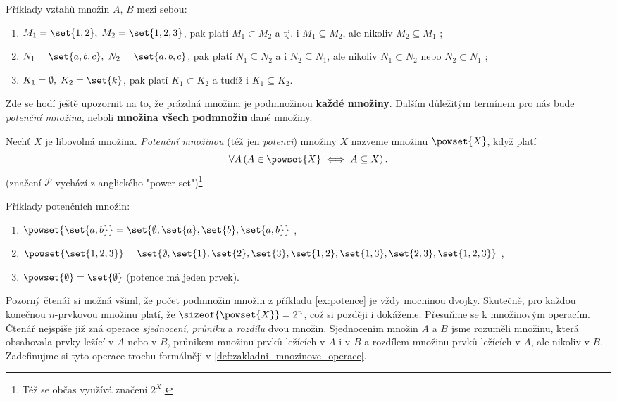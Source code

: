 \begin{example}
    Příklady vztahů množin $A,\,B$ mezi sebou:
    \begin{enumerate}[label=(\roman*)]
        \item $M_1=\set{1,2},\; M_2=\set{1,2,3}$, pak platí $M_1 \subset M_2$ a tj. i $M_1 \subseteq M_2$, ale nikoliv $M_2 \subseteq M_1$ ;
        \item $N_1=\set{a,b,c},\; N_2=\set{a,b,c}$, pak platí $N_1 \subseteq N_2$ a i $N_2 \subseteq N_1$, ale nikoliv $N_1 \subset N_2$ nebo $N_2 \subset N_1$ ;
        \item $K_1=\emptyset,\; K_2=\set{k}$, pak platí $K_1 \subset K_2$ a tudíž i $K_1 \subseteq K_2$.
    \end{enumerate}
\end{example}
Zde se hodí ještě upozornit na to, že prázdná množina je podmnožinou \textbf{každé množiny}. Dalším důležitým termínem pro nás bude \emph{potenční množina}, neboli \textbf{množina všech podmnožin} dané množiny.
\begin{definition}\label{def:potence}
    Nechť $X$ je libovolná množina. \emph{Potenční množinou} (též jen \emph{potencí}) množiny $X$ nazveme množinu $\powset{X}$, když platí
    \begin{equation*}
        \forall A \left(A \in \powset{X} \iff A \subseteq X\right).
    \end{equation*}
    (značení $\mathcal{P}$ vychází z anglického "power set")\footnote{Též se občas využívá značení $2^{X}$.}
\end{definition} 
\begin{example}\label{ex:potence}
    Příklady potenčních množin:
    \begin{enumerate}[label=(\roman*)]
        \item $\powset{\set{a,b}}=\set{\emptyset,\set{a},\set{b},\set{a,b}}$ ,
        \item $\powset{\set{1,2,3}}=\set{\emptyset,\set{1},\set{2},\set{3},\set{1,2},\set{1,3},\set{2,3},\set{1,2,3}}$ ,
        \item $\powset{\emptyset}=\set{\emptyset}$ (potence má jeden prvek).
    \end{enumerate}
\end{example}
Pozorný čtenář si možná všiml, že počet podmnožin množin z příkladu \ref{ex:potence} je vždy mocninou dvojky. Skutečně, pro každou konečnou $n$-prvkovou množinu platí, že $\sizeof{\powset{X}}=2^n$, což si později i dokážeme.
Přesuňme se k množinovým operacím. Čtenář nejspíše již zná operace \emph{sjednocení}, \emph{průniku} a \emph{rozdílu} dvou množin. Sjednocením množin $A$ a $B$ jsme rozuměli množinu, která obsahovala prvky ležící v $A$ nebo v $B$, průnikem množinu prvků ležících v $A$ i v $B$ a rozdílem množinu prvků ležících v $A$, ale nikoliv v $B$. Zadefinujme si tyto operace trochu formálněji v \ref{def:zakladni_mnozinove_operace}. 

